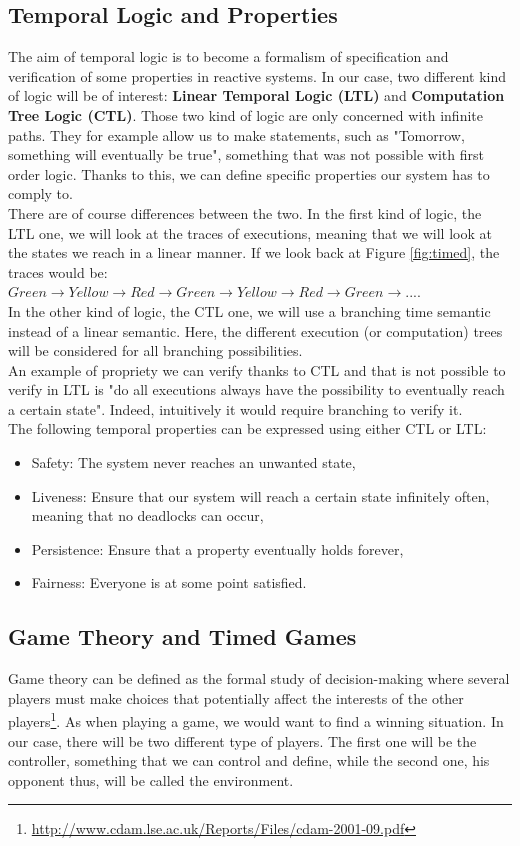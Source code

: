 \subsection{Temporal Logic and Properties}
The aim of temporal logic is to become a formalism of specification and verification of some properties in reactive systems. In our case, two different kind of logic will be of interest: \textbf{Linear Temporal Logic (LTL)} and \textbf{Computation Tree Logic (CTL)}. Those two kind of logic are only concerned with infinite paths. They for example allow us to make statements, such as "Tomorrow, something will eventually be true", something that was not possible with first order logic. Thanks to this, we can define specific properties our system has to comply to. \\
There are of course differences between the two. In the first kind of logic, the LTL one, we will look at the traces of executions, meaning that we will look at the states we reach in a linear manner.
If we look back at Figure \ref{fig:timed}, the traces would be:\\ ${Green \rightarrow Yellow \rightarrow Red \rightarrow Green \rightarrow Yellow \rightarrow Red \rightarrow Green \rightarrow ...}$. \\
In the other kind of logic, the CTL one, we will use a branching time semantic instead of a linear semantic. Here, the different execution (or computation) trees will be considered for all branching possibilities. \\
An example of propriety we can verify thanks to CTL and that is not possible to verify in LTL is "do all executions always have the possibility to eventually reach a certain state". Indeed, intuitively it would require branching to verify it. \\
The following temporal properties can be expressed using either CTL or LTL:
\begin{itemize}
    \item Safety: The system never reaches an unwanted state,
    \item Liveness: Ensure that our system will reach a certain state infinitely often, meaning that no deadlocks can occur,
    \item Persistence: Ensure that a property eventually holds forever,
    \item Fairness: Everyone is at some point satisfied.
\end{itemize}

\subsection{Game Theory and Timed Games} \label{sec:game}
Game theory can be defined as the formal study of decision-making where several players must make choices that potentially affect the interests of the other players\footnote{\url{http://www.cdam.lse.ac.uk/Reports/Files/cdam-2001-09.pdf}}. As when playing a game, we would want to find a winning situation. In our case, there will be two different type of players. The first one will be the controller, something that we can control and define, while the second one, his opponent thus, will be called the environment. \\

